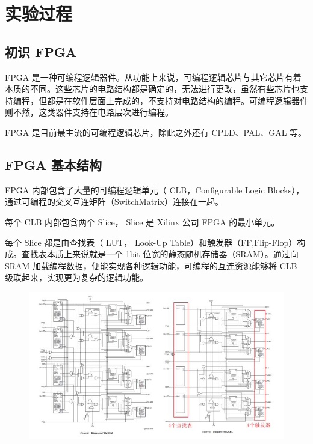\documentclass[UTF8]{article}
\begin{document}
	\section{实验过程}
	\subsection{初识 FPGA}
	FPGA 是一种可编程逻辑器件。从功能上来说，可编程逻辑芯片与其它芯片有着本质的不同。这些芯片的电路结构都是确定的，无法进行更改，虽然有些芯片也支持编程，但都是在软件层面上完成的，不支持对电路结构的编程。可编程逻辑器件则不然，这类器件支持在电路层次进行编程。\par
	FPGA 是目前最主流的可编程逻辑芯片，除此之外还有 CPLD、PAL、GAL 等。\par
	
	\subsection{FPGA 基本结构}
	FPGA 内部包含了大量的可编程逻辑单元（ CLB，Configurable Logic Blocks），通过可编程的交叉互连矩阵（SwitchMatrix）连接在一起。\par
	每个 CLB 内部包含两个 Slice， Slice 是 Xilinx 公司 FPGA 的最小单元。\par
	每个 Slice 都是由查找表（ LUT， Look-Up Table）和触发器（FF,Flip-Flop）构成。查找表本质上来说就是一个 1bit 位宽的静态随机存储器（SRAM）。通过向 SRAM 加载编程数据，便能实现各种逻辑功能，可编程的互连资源能够将 CLB 级联起来，实现更为复杂的逻辑功能。\par
	\begin{figure}[H]
		\centering
		\includegraphics[width=1\linewidth]{s2.jpg}
		\label{s2}
	\end{figure}
\end{document}
